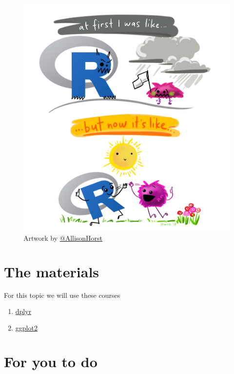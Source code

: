 \documentclass[
]{book}
\providecommand{\tightlist}{%
  \setlength{\itemsep}{0pt}\setlength{\parskip}{0pt}}
\begin{document}
\begin{figure}
\centering
\includegraphics{r_first_then.png}
\caption{\label{fig:unnamed-chunk-3}Artwork by \href{https://github.com/allisonhorst}{@AllisonHorst}}
\end{figure}

\hypertarget{the-materials-1}{%
\section{The materials}\label{the-materials-1}}

For this topic we will use these courses

\begin{enumerate}
\def\labelenumi{\arabic{enumi}.}
\tightlist
\item
  \href{https://danmaclean.github.io/tidyversebook/index.html}{dplyr}
\item
  \href{https://danmaclean.github.io/ggplotbook/index.html}{ggplot2}
\end{enumerate}

\hypertarget{for-you-to-do-1}{%
\section{For you to do}\label{for-you-to-do-1}}
\end{document}
